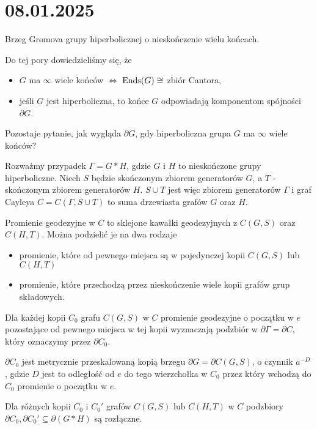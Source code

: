 \section{08.01.2025}{Brzeg Gromova grupy hiperbolicznej o nieskończenie wielu końcach.}

Do tej pory dowiedzieliśmy się, że
\begin{itemize}
  \item $G$ ma $\infty$ wiele końców $\iff$ $\operatorname{Ends}(G)\cong$ zbiór Cantora,
  \item jeśli $G$ jest hiperboliczna, to końce $G$ odpowiadają komponentom spójności $\partial G$.
\end{itemize}

Pozostaje pytanie, jak wygląda $\partial G$, gdy hiperboliczna grupa $G$ ma $\infty$ wiele końców?

Rozważmy przypadek $\Gamma=G\ast H$, gdzie $G$ i $H$ to nieskończone grupy hiperboliczne. Niech $S$ będzie skończonym zbiorem generatorów $G$, a $T$ - skończonym zbiorem generatorów $H$. $S\cup T$ jest więc zbiorem generatorów $\Gamma$ i graf Cayleya $C=C(\Gamma, S\cup T)$ to suma drzewiasta grafów $G$ oraz $H$.

Promienie geodezyjne w $C$ to sklejone kawałki geodezyjnych z $C(G,S)$ oraz $C(H,T)$. Można podzielić je na dwa rodzaje
\begin{itemize}
  \item promienie, które od pewnego miejsca są w pojedynczej kopii $C(G,S)$ lub $C(H,T)$
  \item promienie, które przechodzą przez nieskończenie wiele kopii grafów grup składowych.
\end{itemize}
Dla każdej kopii $C_0$ grafu $C(G,S)$ w $C$ promienie geodezyjne o początku w $e$ pozostające od pewnego miejsca w tej kopii wyznaczają podzbiór w $\partial\Gamma=\partial C$, który oznaczymy przez $\partial C_0$.

\begin{fact}{}{}
  $\partial C_0$ jest metrycznie przeskalowaną kopią brzegu $\partial G=\partial C(G,S)$, o czynnik $a^{-D}$, gdzie $D$ jest to odległość od $e$ do tego wierzchołka w $C_0$ przez który wchodzą do $C_0$ promienie o początku w $e$.
\end{fact}

\begin{fact}{}{}
  Dla różnych kopii $C_0$ i $C_0'$ grafów $C(G,S)$ lub $C(H,T)$ w $C$ podzbiory $\partial C_0,\partial C_0'\subseteq\partial (G\ast H)$ są rozłączne.
\end{fact}

